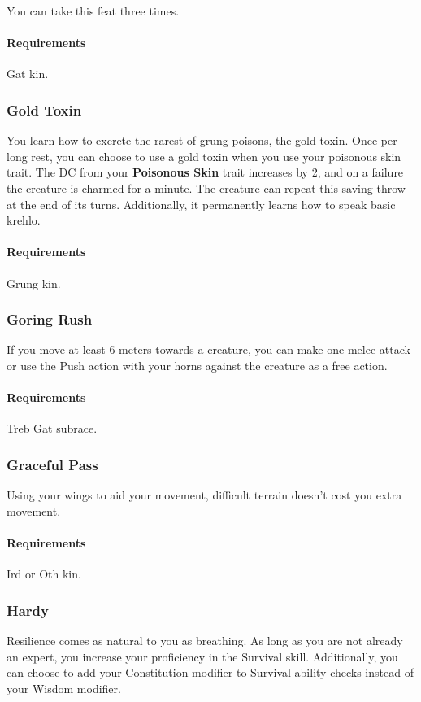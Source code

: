     You can take this feat three times.
    \paragraph{Requirements} Gat kin.
\subsubsection{Gold Toxin} \label{feat::goldtoxin}
    You learn how to excrete the rarest of grung poisons, the gold toxin.
    Once per long rest, you can choose to use a gold toxin when you use your poisonous skin trait.
    The DC from your \textbf{Poisonous Skin} trait increases by 2, and on a failure the creature is charmed for a minute.
    The creature can repeat this saving throw at the end of its turns.
    Additionally, it permanently learns how to speak basic krehlo.
    \paragraph{Requirements} Grung kin.
\subsubsection{Goring Rush} \label{feat::goringrush}
    If you move at least 6 meters towards a creature, you can make one melee attack or use the Push action with your horns against the creature as a free action.
    \paragraph{Requirements} Treb Gat subrace.
\subsubsection{Graceful Pass} \label{feat::gracefulpass}
    Using your wings to aid your movement, difficult terrain doesn't cost you extra movement.
    \paragraph{Requirements} Ird or Oth kin.
\subsubsection{Hardy} \label{feat::hardy}
    Resilience comes as natural to you as breathing.
    As long as you are not already an expert, you increase your proficiency in the Survival skill.
    Additionally, you can choose to add your Constitution modifier to Survival ability checks instead of your Wisdom modifier.
